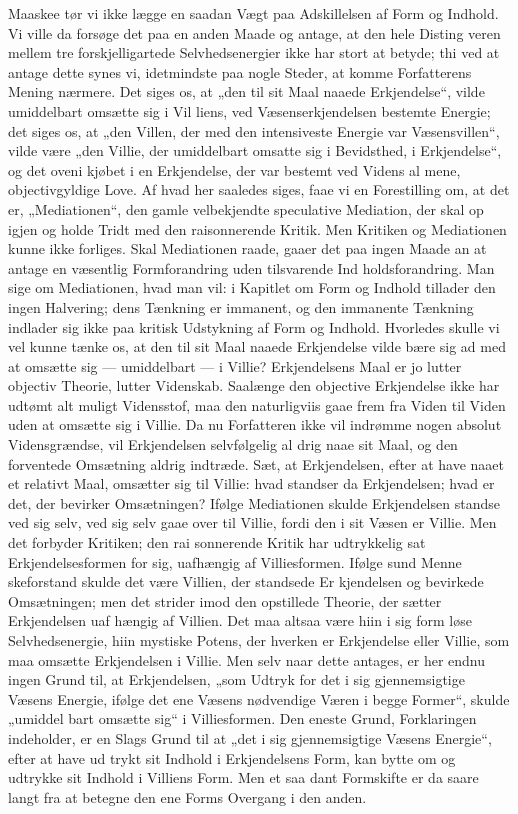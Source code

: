 \documentclass[12pt]{book}
\newcommand{\opage}[1]{\marginnote{\footnotesize\textit{[#1]}}}
\begin{document}
Maaskee tør vi ikke lægge en saadan Vægt paa
Adskillelsen af Form og Indhold. Vi ville da forsøge
det paa en anden Maade og antage, at den hele Disting\-%
veren mellem tre forskjelligartede Selvhedsenergier ikke
har stort at betyde; thi ved at antage dette synes vi,
idetmindste paa nogle Steder, at komme Forfatterens
Mening nærmere. Det siges os, at „den til sit Maal
naaede Erkjendelse“, vilde umiddelbart omsætte sig i Vil\-%
liens, ved Væsenserkjendelsen bestemte Energie; det siges
os, at „den Villen, der med den intensiveste Energie var
Væsensvillen“, vilde være „den Villie, der umiddelbart
omsatte sig i Bevidsthed, i Erkjendelse“, og det oveni\-%
kjøbet i en Erkjendelse, der var bestemt ved Videns al\-%
mene, objectivgyldige Love. Af hvad her saaledes siges,
faae vi en Forestilling om, at det er, „Mediationen“, den
gamle velbekjendte speculative Mediation, der skal op
igjen og holde Tridt med den raisonnerende Kritik.
Men Kritiken og Mediationen kunne ikke forliges. Skal
Mediationen raade, gaaer det paa ingen Maade an at
antage en væsentlig Formforandring uden tilsvarende Ind\-%
holdsforandring. Man sige om Mediationen, hvad man
vil: i Kapitlet om Form og Indhold tillader den ingen
Halvering; dens Tænkning er immanent, og den immanente
Tænkning indlader sig ikke paa kritisk Udstykning af
Form og Indhold. Hvorledes skulle vi vel kunne tænke
os, at den til sit Maal naaede Erkjendelse vilde bære
sig ad med at omsætte sig --- umiddelbart --- i Villie?
Erkjendelsens Maal er jo lutter objectiv Theorie, lutter
Videnskab. Saalænge den objective Erkjendelse ikke
har udtømt alt muligt Vidensstof, maa den naturligviis
gaae frem fra Viden til Viden uden at omsætte sig i
Villie. Da nu Forfatteren ikke vil indrømme nogen
\opage{41}\setcounter{footnote}{0}%
absolut Vidensgrændse, vil Erkjendelsen selvfølgelig al\-%
drig naae sit Maal, og den forventede Omsætning aldrig
indtræde. Sæt, at Erkjendelsen, efter at have naaet et
relativt Maal, omsætter sig til Villie: hvad standser da
Erkjendelsen; hvad er det, der bevirker Omsætningen?
Ifølge Mediationen skulde Erkjendelsen standse ved sig
selv, ved sig selv gaae over til Villie, fordi den i sit
Væsen er Villie. Men det forbyder Kritiken; den rai\-%
sonnerende Kritik har udtrykkelig sat Erkjendelsesformen
for sig, uafhængig af Villiesformen. Ifølge sund Menne\-%
skeforstand skulde det være Villien, der standsede Er\-%
kjendelsen og bevirkede Omsætningen; men det strider
imod den opstillede Theorie, der sætter Erkjendelsen uaf\-%
hængig af Villien. Det maa altsaa være hiin i sig form\-%
løse Selvhedsenergie, hiin mystiske Potens, der hverken
er Erkjendelse eller Villie, som maa omsætte Erkjendelsen
i Villie. Men selv naar dette antages, er her endnu
ingen Grund til, at Erkjendelsen, „som Udtryk for det i
sig gjennemsigtige Væsens Energie, ifølge det ene Væsens
nødvendige Væren i begge Former“, skulde „umiddel\-%
bart omsætte sig“ i Villiesformen. Den eneste Grund,
Forklaringen indeholder, er en Slags Grund til at „det
i sig gjennemsigtige Væsens Energie“, efter at have ud\-%
trykt sit Indhold i Erkjendelsens Form, kan bytte om
og udtrykke sit Indhold i Villiens Form. Men et saa\-%
dant Formskifte er da saare langt fra at betegne den
ene Forms Overgang i den anden.
\end{document}
